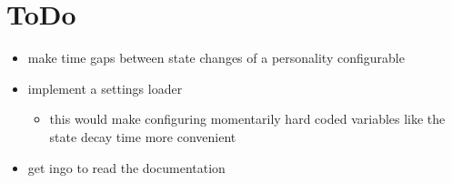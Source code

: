 \section{ToDo}
\begin{itemize}
    \item make time gaps between state changes of a personality configurable
    \item implement a settings loader
    \begin{itemize}
        \item this would make configuring momentarily hard coded variables like the state decay time more convenient
    \end{itemize}
    \item get ingo to read the documentation
\end{itemize}
